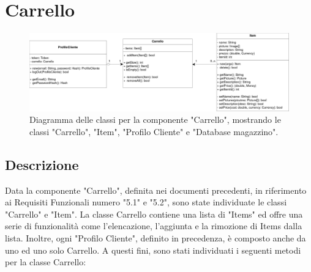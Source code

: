 \documentclass{report}
\begin{document}
\section{Carrello}
\begin{figure}[H]
	\centering\includegraphics[width=1\textwidth]{images/Diagramma_delle_classi_carrello.png}
	Diagramma delle classi per la componente "Carrello", mostrando le classi "Carrello", "Item", "Profilo Cliente" e "Database magazzino".
\end{figure}

\subsection*{Descrizione}
Data la componente "Carrello", definita nei documenti precedenti, in riferimento ai Requisiti Funzionali numero "5.1" e "5.2", sono state individuate le classi "Carrello" e "Item". La classe Carrello contiene una lista di "Items" ed offre una serie di funzionalità come l'elencazione, l'aggiunta e la rimozione di Items dalla lista. Inoltre, ogni "Profilo Cliente", definito in precedenza, è composto anche da uno ed uno solo Carrello. A questi fini, sono stati individuati i seguenti metodi per la classe Carrello:
\end{document}
